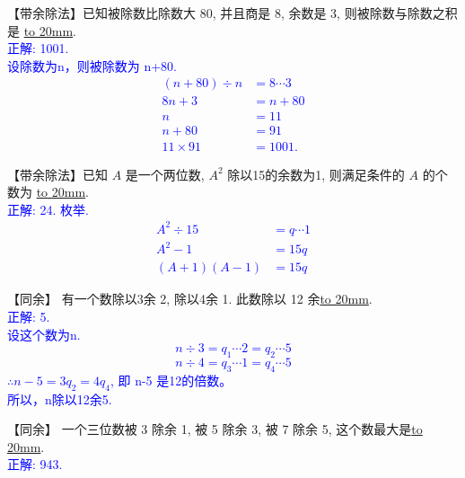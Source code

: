 \item {
    【带余除法】已知被除数比除数大 80, 并且商是 8, 余数是 3, 则被除数与除数之积是 \underline{\hbox to 20mm{}}.
    \ifshowSolution
        \\\fangsong{}\textcolor{blue}{
            正解: 1001.\\
            设除数为n，则被除数为 n+80.\\
            \begin{align*}
                (n+80)\div n &= 8\cdots 3\\
                8n + 3 &= n + 80\\
                n&=11\\
                n+80&=91\\
                11\times 91 &= 1001.
            \end{align*}
        }
    \else
        \vspace{1cm}
    \fi
}

\item {
    【带余除法】已知 $A$ 是一个两位数, $A^2$ 除以15的余数为1, 则满足条件的 $A$ 的个数为 \underline{\hbox to 20mm{}}.
    \ifshowSolution
        \\\fangsong{}\textcolor{blue}{
            正解: 24. 枚举.\\
            \begin{align*}
                A^2\div 15 &= q\cdots 1\\
                A^2 - 1 &= 15q\\
                (A+1)(A-1) &= 15q
            \end{align*}
        }
    \else
        \vspace{1cm}
    \fi
}

\item {
    【同余】
    有一个数除以3余 2, 除以4余 1. 此数除以 12 余\underline{\hbox to 20mm{}}.
    \ifshowSolution
        \\\fangsong{}\textcolor{blue}{
            正解: 5.\\
            设这个数为n.
            \[ n \div 3 = q_1\cdots 2 = q_2\cdots 5 \]
            \[ n \div 4 = q_3\cdots 1 = q_4\cdots 5 \]
            $\therefore n-5 = 3q_2 = 4q_4$, 即 n-5 是12的倍数。\\
            所以，n除以12余5.
        }
    \else
        \vspace{1cm}
    \fi
}

\item {
    【同余】
    一个三位数被 3 除余 1, 被 5 除余 3, 被 7 除余 5, 这个数最大是\underline{\hbox to 20mm{}}.
    \ifshowSolution
        \\\fangsong{}\textcolor{blue}{
            正解: 943.
        }
    \else
        \vspace{1cm}
    \fi
}

